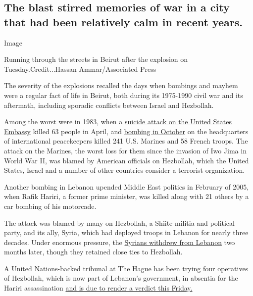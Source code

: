 \hypertarget{the-blast-stirred-memories-of-war-in-a-city-that-had-been-relatively-calm-in-recent-years}{%
\subsection{The blast stirred memories of war in a city that had been
relatively calm in recent
years.}\label{the-blast-stirred-memories-of-war-in-a-city-that-had-been-relatively-calm-in-recent-years}}

Image

Running through the streets in Beirut after the explosion on
Tuesday.Credit...Hassan Ammar/Associated Press

The severity of the explosions recalled the days when bombings and
mayhem were a regular fact of life in Beirut, both during its 1975-1990
civil war and its aftermath, including sporadic conflicts between Israel
and Hezbollah.

Among the worst were in 1983, when a
\href{https://www.history.com/this-day-in-history/suicide-bomber-destroys-u-s-embassy-in-beirut}{suicide
attack on the United States Embassy} killed 63 people in April, and
\href{https://www.history.com/this-day-in-history/beirut-barracks-blown-up}{bombing
in October} on the headquarters of international peacekeepers killed 241
U.S. Marines and 58 French troops. The attack on the Marines, the worst
loss for them since the invasion of Iwo Jima in World War II, was blamed
by American officials on Hezbollah, which the United States, Israel and
a number of other countries consider a terrorist organization.

Another bombing in Lebanon upended Middle East politics in February of
2005, when Rafik Hariri, a former prime minister, was killed along with
21 others by a car bombing of his motorcade.

The attack was blamed by many on Hezbollah, a Shiite militia and
political party, and its ally, Syria, which had deployed troops in
Lebanon for nearly three decades. Under enormous pressure, the
\href{https://www.nytimes3xbfgragh.onion/2005/04/26/international/middleeast/syrian-troops-leave-lebanon-after-29year-occupation.html}{Syrians
withdrew from Lebanon} two months later, though they retained close ties
to Hezbollah.

A United Nations-backed tribunal at The Hague has been trying four
operatives of Hezbollah, which is now part of Lebanon's government, in
absentia for the Hariri assassination
\href{https://www.reuters.com/article/us-lebanon-tribunal-hariri/crisis-weary-lebanon-braces-for-hariri-tribunal-verdict-idUSKCN2500JU}{and
is due to render a verdict this Friday.}

